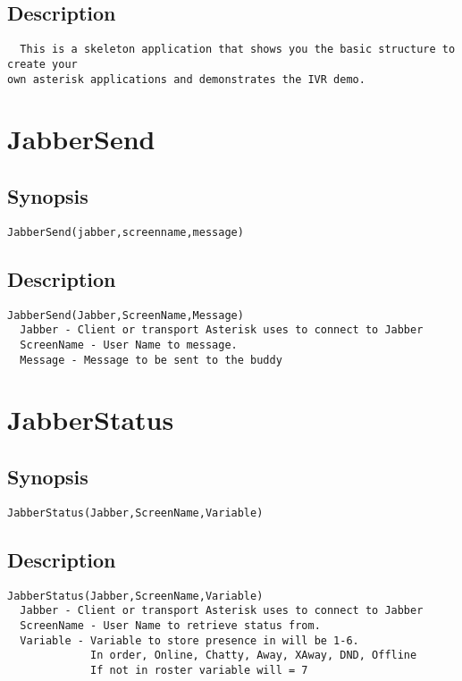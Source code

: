 \subsection{Description}
\begin{verbatim}
  This is a skeleton application that shows you the basic structure to create your
own asterisk applications and demonstrates the IVR demo.

\end{verbatim}


\section{JabberSend}
\subsection{Synopsis}
\begin{verbatim}
JabberSend(jabber,screenname,message)
\end{verbatim}
\subsection{Description}
\begin{verbatim}
JabberSend(Jabber,ScreenName,Message)
  Jabber - Client or transport Asterisk uses to connect to Jabber
  ScreenName - User Name to message.
  Message - Message to be sent to the buddy

\end{verbatim}


\section{JabberStatus}
\subsection{Synopsis}
\begin{verbatim}
JabberStatus(Jabber,ScreenName,Variable)
\end{verbatim}
\subsection{Description}
\begin{verbatim}
JabberStatus(Jabber,ScreenName,Variable)
  Jabber - Client or transport Asterisk uses to connect to Jabber
  ScreenName - User Name to retrieve status from.
  Variable - Variable to store presence in will be 1-6.
             In order, Online, Chatty, Away, XAway, DND, Offline
             If not in roster variable will = 7

\end{verbatim}


